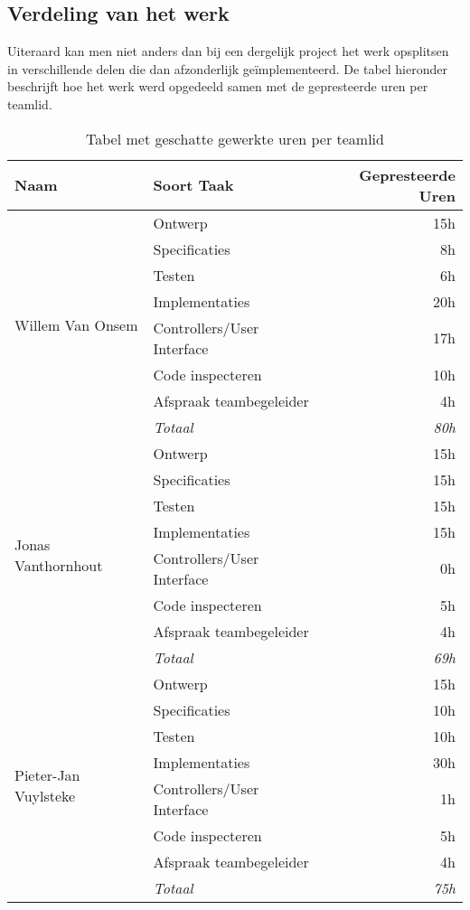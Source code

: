 \subsection{Verdeling van het werk}
Uiteraard kan men niet anders dan bij een dergelijk project het werk opsplitsen in verschillende delen die dan afzonderlijk ge\"implementeerd. De tabel hieronder beschrijft hoe het werk werd opgedeeld samen met de gepresteerde uren per teamlid.
\begin{table}[H]
\centering
\begin{tabular}{|l|l|r|}
\hline
\textbf{Naam}&\textbf{Soort Taak}&\textbf{Gepresteerde Uren}\\\hline\hline
\multirow{8}{*}{Willem Van Onsem}&Ontwerp&15h\\
&Specificaties&8h\\
&Testen&6h\\
&Implementaties&20h\\
&Controllers/User Interface&17h\\
&Code inspecteren&10h\\
&Afspraak teambegeleider&4h\\
&\textit{Totaal}&\textit{80h}\\\hline
\multirow{8}{*}{Jonas Vanthornhout}&Ontwerp&15h\\
&Specificaties&15h\\
&Testen&15h\\
&Implementaties&15h\\
&Controllers/User Interface&0h\\
&Code inspecteren&5h\\
&Afspraak teambegeleider&4h\\
&\textit{Totaal}&\textit{69h}\\\hline
\multirow{8}{*}{Pieter-Jan Vuylsteke}&Ontwerp&15h\\
&Specificaties&10h\\
&Testen&10h\\
&Implementaties&30h\\
&Controllers/User Interface&1h\\
&Code inspecteren&5h\\
&Afspraak teambegeleider&4h\\
&\textit{Totaal}&\textit{75h}\\\hline
\end{tabular}
\caption{Tabel met geschatte gewerkte uren per teamlid}
\label{tbl:workedHours}
\end{table}
